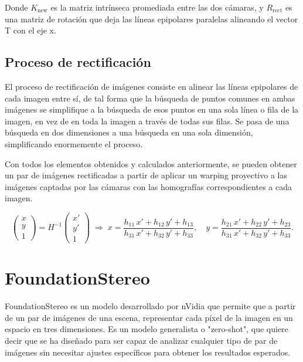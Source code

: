 Donde \(K_{\mathrm{new}}\) es la matriz intrínseca promediada entre las dos cámaras,  
y \(R_{\mathrm{rect}}\) es una matriz de rotación que deja las líneas epipolares paralelas alineando el vector T con el eje x.


\subsection{Proceso de rectificación}
El proceso de rectificación de imágenes consiste en alinear las líneas epipolares de cada imagen entre sí, de tal forma que la búsqueda de puntos comunes en ambas imágenes se simplifique a la búsqueda de esos puntos en una sola línea o fila de la imagen, en vez de en toda la imagen a través de todas sus filas. Se pasa de una búsqueda en dos dimensiones a una búsqueda en una sola dimensión, simplificando enormemente el proceso.

Con todos los elementos obtenidos y calculados anteriormente, se pueden obtener un par de imágenes rectificadas a partir de aplicar un warping proyectivo a las imágenes captadas por las cámaras con las homografías correspondientes a cada imagen.

\[
\begin{pmatrix}
	x \\[6pt]
	y \\[3pt]
	1
\end{pmatrix}
=
H^{-1}
\begin{pmatrix}
	x' \\[6pt]
	y' \\[3pt]
	1
\end{pmatrix}
\;\Longrightarrow\;
x = \frac{h_{11}\,x' + h_{12}\,y' + h_{13}}{h_{31}\,x' + h_{32}\,y' + h_{33}},
\quad
y = \frac{h_{21}\,x' + h_{22}\,y' + h_{23}}{h_{31}\,x' + h_{32}\,y' + h_{33}}.
\]


\section{FoundationStereo}
FoundationStereo es un modelo desarrollado por nVidia que permite que a partir de un par de imágenes de una escena, representar cada píxel de la imagen en un espacio en tres dimensiones. Es un modelo generalista o "zero-shot", que quiere decir que se ha diseñado para ser capaz de analizar cualquier tipo de par de imágenes sin necesitar ajustes específicos para obtener los resultados esperados.

